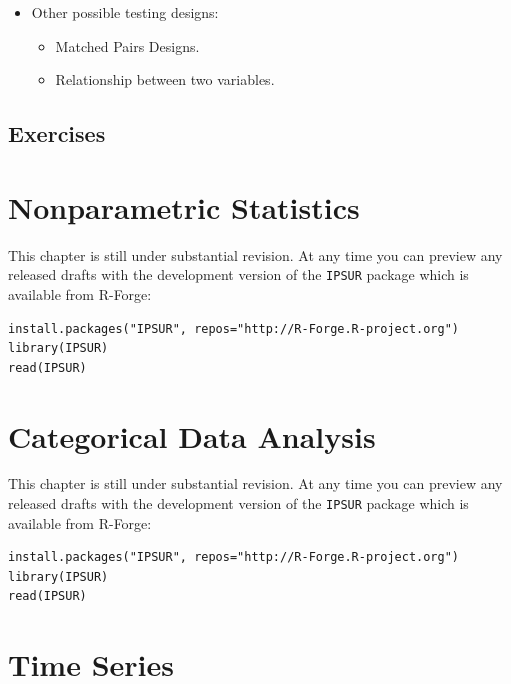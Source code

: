 \documentclass[captions=tableheading]{scrbook}
\begin{document}
\begin{itemize}
\item Other possible testing designs:
\begin{itemize}
\item Matched Pairs Designs.
\item Relationship between two variables.
\end{itemize}
\end{itemize}

\newpage{}
\section{Exercises}
\label{sec-13-5}

\setcounter{thm}{0}
\chapter{Nonparametric Statistics}
\label{sec-14}

\label{cha:Nonparametric-Statistics}


This chapter is still under substantial revision. At any time you can preview any released drafts with the development version of the \texttt{IPSUR} package which is available from \textsf{R}-Forge:


\begin{verbatim}
install.packages("IPSUR", repos="http://R-Forge.R-project.org")
library(IPSUR)
read(IPSUR)
\end{verbatim}
\chapter{Categorical Data Analysis}
\label{sec-15}

\label{cha:Categorical-Data-Analysis}


This chapter is still under substantial revision. At any time you can preview any released drafts with the development version of the \texttt{IPSUR} package which is available from \textsf{R}-Forge:


\begin{verbatim}
install.packages("IPSUR", repos="http://R-Forge.R-project.org")
library(IPSUR)
read(IPSUR)
\end{verbatim}
\chapter{Time Series}
\label{sec-16}

\label{cha:Time-Series}
\end{document}
